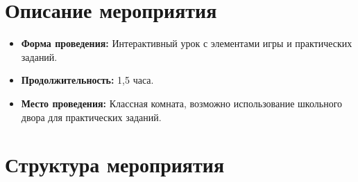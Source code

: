 \documentclass[a4paper,12pt]{article}
\begin{document}
\section*{Описание мероприятия}
\begin{itemize}
    \item \textbf{Форма проведения:} Интерактивный урок с элементами игры и практических заданий.
    \item \textbf{Продолжительность:} 1,5 часа.
    \item \textbf{Место проведения:} Классная комната, возможно использование школьного двора для практических заданий.
\end{itemize}

\section*{Структура мероприятия}
\end{document}

